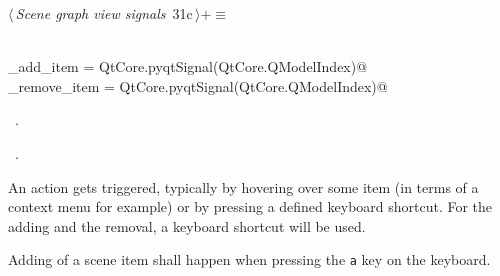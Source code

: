 \documentclass[
    a4paper,      %
    10pt,         %
    openright,    %
    notitlepage,  %
    parskip=half, %
]{scrreprt}       %
\theoremstyle{definition}                    %
\begin{document}
\begin{flushleft} \small
\begin{minipage}{\linewidth}\label{scrap33}\raggedright\small
{} $\langle\,${\itshape Scene graph view signals}\nobreak\ {\footnotesize {31c}}$\,\rangle+\equiv$
\vspace{-1ex}
\begin{list}{}{} \item
\mbox{}\lstinline@@\\
\mbox{}\lstinline@do_add_item = QtCore.pyqtSignal(QtCore.QModelIndex)@\\
\mbox{}\lstinline@do_remove_item = QtCore.pyqtSignal(QtCore.QModelIndex)@\\
\mbox{}\lstinline@@{\NWsep}
\end{list}
\vspace{-1.5ex}
\footnotesize
\begin{list}{}{\setlength{\itemsep}{-\parsep}\setlength{\itemindent}{-\leftmargin}}
\item \NWtxtMacroDefBy\ .
\item \NWtxtMacroRefIn\ .

\item{}
\end{list}
\end{minipage}\vspace{4ex}
\end{flushleft}
An action gets triggered, typically by hovering over some item (in terms of a
context menu for example) or by pressing a defined keyboard shortcut. For the
adding and the removal, a keyboard shortcut will be used.

Adding of a scene item shall happen when pressing the \verb=a= key on the
keyboard.
\end{document}
